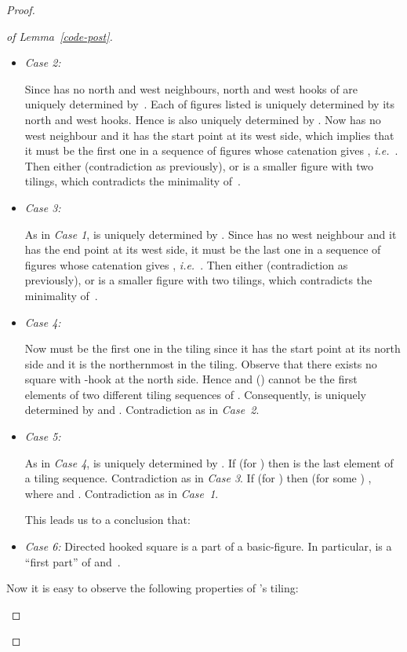 \documentclass[final,nomarks]{dmtcs-episciences}
\begin{document}
\begin{proof}
\begin{proof}[of Lemma~\ref{code-post}]
\begin{itemize}
\item\emph{Case 2:}


Since  has no north and west neighbours, north and west hooks of
 are uniquely determined by~.
Each of figures listed is uniquely determined by its north and west hooks.
Hence  is also uniquely determined by . Now
 has no west neighbour and it has the start point at its west side,
which implies that it must be the first one in a
sequence of figures whose catenation gives , \textit{i.e.}\
. Then either  (contradiction as previously), or
 is a smaller
figure with two tilings, which contradicts
the minimality of~.

\item\emph{Case 3:}
\\ 
\mbox{}\hfill 

As in \emph{Case 1},  is uniquely determined by . Since
 has no west neighbour and it has the end point at its west
side, it must be the last one in a sequence of figures whose
catenation gives , \textit{i.e.}\ . Then either
 (contradiction as previously), or  is a smaller figure with
two tilings, which contradicts the minimality of~.

\item\emph{Case 4:}


Now  must be the first one in the tiling since it has the
start point at its north side and it is the northernmost in the
tiling. Observe that there exists no square with -hook at the
north side. Hence  and 
() cannot be the first elements of two different
tiling sequences of . Consequently,  is uniquely
determined by  and . Contradiction as in
\emph{Case~2}.

\item\emph{Case 5:}


As in \emph{Case 4},  is uniquely determined by . If
 (for ) then  is the last
element of a tiling sequence. Contradiction as in \emph{Case 3}.
If  (for ) then (for some
) , where
 and
. Contradiction as in
\emph{Case~1}.

This leads us to a conclusion that:

\item\emph{Case 6:} Directed hooked square  is a part of a
basic-figure. In particular,  is a ``first part'' of 
and~.

\end{itemize}

Now it is easy to observe the following properties of 's tiling:
\begin{enumerate}


\end{enumerate}
\end{proof}
\end{proof}
\end{document}
